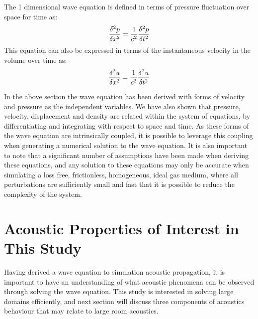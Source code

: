 The 1 dimensional wave equation is defined in terms of pressure fluctuation over space for time as:
\begin{equation}
 \frac{\delta^2 p}{\delta x^2}=\frac{1}{c^2}\frac{\delta^2 p}{\delta t^2}\\
\end{equation}
This equation can also be expressed in terms of the instantaneous velocity in the volume over time as:
\begin{equation}
 \frac{\delta^2 u}{\delta x^2}=\frac{1}{c^2}\frac{\delta^2 u}{\delta t^2}\\
\end{equation}

In the above section the wave equation has been derived with forms of velocity and pressure as the independent variables. We have also shown that pressure, velocity, displacement and density are related within the system of equations, by differentiating and integrating with respect to space and time. As these forms of the wave equation are intrinsically coupled, it is possible to leverage this coupling when generating a numerical solution to the wave equation. It is also important to note that a significant number of assumptions have been made when deriving these equations, and any solution to these equations may only be accurate when simulating a loss free, frictionless, homogeneous, ideal gas medium, where all perturbations are sufficiently small and fast that it is possible to reduce the complexity of the system.\\

\section{Acoustic Properties of Interest in This Study}
Having derived a wave equation to simulation acoustic propagation, it is important to have an understanding of what acoustic phenomena can be observed through solving the wave equation. This study is interested in solving large domains efficiently, and next section will discuss three components of acoustics behaviour that may relate to large room acoustics.\\

